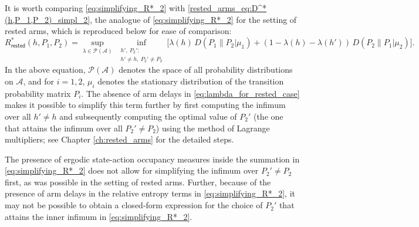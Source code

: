 {\color{black} It is worth comparing \eqref{eq:simplifying_R*_2} with  \eqref{rested_arms_eq:D^*(h,P_1,P_2)_simpl_2}, the analogue of \eqref{eq:simplifying_R*_2} for the setting of rested arms, which is reproduced below for ease of comparison:
\begin{equation}
	R^{*}_{\textsf{rested}}(h, P_{1}, P_{2})=\sup\limits_{\lambda\in \mathcal{P}(\mathcal{A})}\,\inf\limits_{\substack{h', ~P_{2}':\\ h'\neq h, ~P_{2}'\neq P_{2}}} \bigg[\lambda(h)\,D(P_{1}\|P_{2}|\mu_{1})+(1-\lambda(h)-\lambda(h'))\,D(P_{2}\|P_{1}|\mu_{2})\bigg].\
	\label{eq:lambda_for_rested_case}
\end{equation}
In the above equation, $\mathcal{P}(\mathcal{A})$ denotes the space of all probability distributions on $\mathcal{A}$, and for $i=1, 2$, $\mu_{i}$ denotes the stationary distribution of the transition probability matrix $P_{i}$. The absence of arm delays in \eqref{eq:lambda_for_rested_case} makes it possible to simplify this term further by first computing the infimum over all $h'\neq h$ and subsequently computing the optimal value of $P_2'$ (the one that attains the infimum over all $P_2'\neq P_2$) using the method of Lagrange multipliers; see Chapter \ref{ch:rested_arms} for the detailed steps.}

The presence of ergodic state-action occupancy measures inside the summation in \eqref{eq:simplifying_R*_2} does not allow for simplifying the infimum over $P_2'\neq P_2$ first, as was possible in the setting of rested arms. Further, because of the presence of arm delays in the relative entropy terms in \eqref{eq:simplifying_R*_2}, it may not be possible to obtain a closed-form expression for the choice of $P_2'$ that attains the inner infimum in \eqref{eq:simplifying_R*_2}. 

